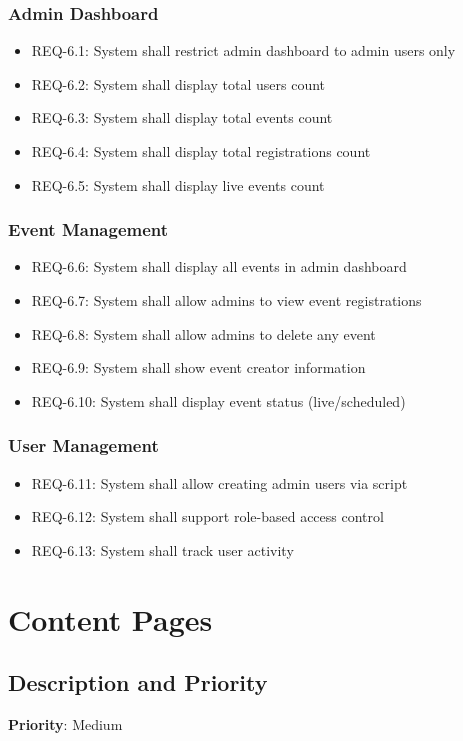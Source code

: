 \documentclass{scrreprt}
\begin{document}
\subsubsection{Admin Dashboard}
\begin{itemize}
\item REQ-6.1: System shall restrict admin dashboard to admin users only
\item REQ-6.2: System shall display total users count
\item REQ-6.3: System shall display total events count
\item REQ-6.4: System shall display total registrations count
\item REQ-6.5: System shall display live events count
\end{itemize}

\subsubsection{Event Management}
\begin{itemize}
\item REQ-6.6: System shall display all events in admin dashboard
\item REQ-6.7: System shall allow admins to view event registrations
\item REQ-6.8: System shall allow admins to delete any event
\item REQ-6.9: System shall show event creator information
\item REQ-6.10: System shall display event status (live/scheduled)
\end{itemize}

\subsubsection{User Management}
\begin{itemize}
\item REQ-6.11: System shall allow creating admin users via script
\item REQ-6.12: System shall support role-based access control
\item REQ-6.13: System shall track user activity
\end{itemize}


\section{Content Pages}

\subsection{Description and Priority}
\textbf{Priority}: Medium
\end{document}
